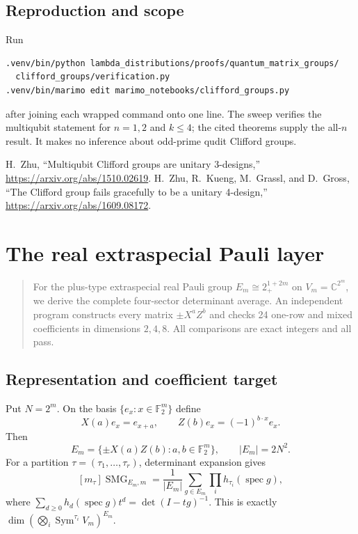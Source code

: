 \documentclass[10pt]{article}
\newcommand{\SMG}{\operatorname{SMG}}
\newcommand{\MGF}{\SMG}
\begin{document}
\subsection{Reproduction and scope}
Run
\begin{verbatim}
.venv/bin/python lambda_distributions/proofs/quantum_matrix_groups/
  clifford_groups/verification.py
.venv/bin/marimo edit marimo_notebooks/clifford_groups.py
\end{verbatim}
after joining each wrapped command onto one line.  The sweep verifies the
multiqubit statement for $n=1,2$ and $k\leq4$; the cited theorems supply the
all-$n$ result.  It makes no inference about odd-prime qudit Clifford groups.

\begin{thebibliography}{9}
 H.~Zhu, ``Multiqubit Clifford groups are unitary
3-designs,'' \url{https://arxiv.org/abs/1510.02619}.
 H.~Zhu, R.~Kueng, M.~Grassl, and D.~Gross,
``The Clifford group fails gracefully to be a unitary 4-design,''
\url{https://arxiv.org/abs/1609.08172}.
\end{thebibliography}
\endgroup


\clearpage
\section{The real extraspecial Pauli layer}\label{proof:real-pauli}
\begingroup
{}
\providecommand{\MGF}{\SMG}
\renewcommand{\MGF}{\SMG}
\setcounter{theorem}{0}
\setcounter{proposition}{0}
\setcounter{lemma}{0}
\setcounter{corollary}{0}
\setcounter{remark}{0}
\begin{abstract}
For the plus-type extraspecial real Pauli group
$E_m\cong 2_+^{1+2m}$ on $V_m=\mathbb C^{2^m}$, we derive the complete
four-sector determinant average.  An independent program constructs every
matrix $\pm X^aZ^b$ and checks 24 one-row and mixed coefficients in
dimensions $2,4,8$.  All comparisons are exact integers and all pass.
\end{abstract}

\subsection{Representation and coefficient target}
Put $N=2^m$.  On the basis $\{e_x:x\in\mathbb F_2^m\}$ define
\[
 X(a)e_x=e_{x+a},\qquad Z(b)e_x=(-1)^{b\cdot x}e_x.
\]
Then
\[
 E_m=\{\pm X(a)Z(b):a,b\in\mathbb F_2^m\},\qquad |E_m|=2N^2.
\]
For a partition $\tau=(\tau_1,\ldots,\tau_r)$, determinant expansion gives
\begin{equation}\label{extraspecial-real-pauli-proof-and-verification:eq:target}
 [m_\tau]\MGF_{E_m,m}
 =\frac1{|E_m|}\sum_{g\in E_m}\prod_i
 h_{\tau_i}(\operatorname{spec}g),
\end{equation}
where $\sum_{d\geq0}h_d(\operatorname{spec}g)t^d=
\det(I-tg)^{-1}$.  This is exactly
$\dim(\bigotimes_i\operatorname{Sym}^{\tau_i}V_m)^{E_m}$.
\end{document}
